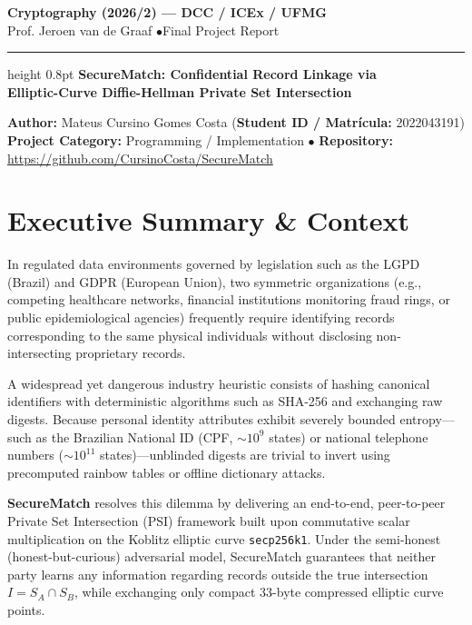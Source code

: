 \documentclass[10pt,a4paper]{article}
\begin{document}
\begin{center}
    {\small \textbf{Cryptography (2026/2) --- DCC / ICEx / UFMG}}\\[0.15em]
    {\footnotesize Prof. Jeroen van de Graaf \quad $\bullet$\quad Final Project Report}
    \vspace{0.4em}
    \hrule height 0.8pt
    \vspace{0.5em}
    {\Large \textbf{SecureMatch: Confidential Record Linkage via\\Elliptic-Curve Diffie-Hellman Private Set Intersection}}
    \vspace{0.3em}
\end{center}

\noindent\textbf{Author:} Mateus Cursino Gomes Costa \quad (\textbf{Student ID / Matrícula:} 2022043191)\\[0.2em]
\textbf{Project Category:} Programming / Implementation \quad $\bullet$ \quad \textbf{Repository:} \url{https://github.com/CursinoCosta/SecureMatch}

\section{Executive Summary \& Context}
In regulated data environments governed by legislation such as the LGPD (Brazil) and GDPR (European Union), two symmetric organizations (e.g., competing healthcare networks, financial institutions monitoring fraud rings, or public epidemiological agencies) frequently require identifying records corresponding to the same physical individuals without disclosing non-intersecting proprietary records.

A widespread yet dangerous industry heuristic consists of hashing canonical identifiers with deterministic algorithms such as SHA-256 and exchanging raw digests. Because personal identity attributes exhibit severely bounded entropy---such as the Brazilian National ID (CPF, $\sim 10^9$ states) or national telephone numbers ($\sim 10^{11}$ states)---unblinded digests are trivial to invert using precomputed rainbow tables or offline dictionary attacks.

\textbf{SecureMatch} resolves this dilemma by delivering an end-to-end, peer-to-peer Private Set Intersection (PSI) framework built upon commutative scalar multiplication on the Koblitz elliptic curve \texttt{secp256k1}. Under the semi-honest (honest-but-curious) adversarial model, SecureMatch guarantees that neither party learns any information regarding records outside the true intersection $I = S_A \cap S_B$, while exchanging only compact 33-byte compressed elliptic curve points.
\end{document}
